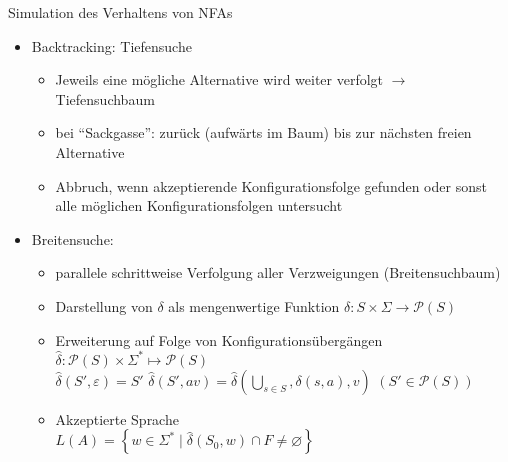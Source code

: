 \begin{frame}{Simulation des Verhaltens von NFAs}
	\begin{itemize}
		\item Backtracking: Tiefensuche
		\begin{itemize}
			\item Jeweils eine mögliche Alternative wird weiter verfolgt $\rightarrow$ Tiefensuchbaum
			\item bei "`Sackgasse"': zurück (aufwärts im Baum) bis zur nächsten freien Alternative
			\item Abbruch, wenn akzeptierende Konfigurationsfolge gefunden oder sonst alle möglichen Konfigurationsfolgen untersucht
		\end{itemize}
		\item Breitensuche:
		\begin{itemize}
			\item parallele schrittweise Verfolgung aller Verzweigungen (Breitensuchbaum)
			\item Darstellung von $\delta$ als mengenwertige Funktion $\delta: S \times \Sigma \rightarrow \mathcal{P}(S)$
			\item Erweiterung auf Folge von Konfigurationsübergängen\\
			\quad $\hat{\delta}: \mathcal{P}(S) \times \Sigma^* \mapsto \mathcal{P}(S)$\\
			\quad $\hat{\delta}(S', \varepsilon) = S'$ \quad $\hat{\delta}(S', av)=\hat{\delta}\left(\bigcup_{s \in S}, \delta(s,a),v\right)$ \quad $(S' \in \mathcal{P}(S))$
			\item Akzeptierte Sprache\\
			\quad $L(A)=\left\{w \in \Sigma^* \mid \hat{\delta}(S_0,w)\cap F \neq \varnothing\right\}$
		\end{itemize}
	\end{itemize}
\end{frame}

